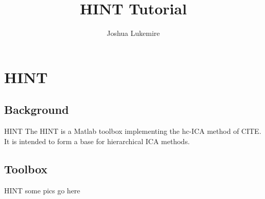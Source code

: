 \documentclass[11pt]{beamer}
\author{Joshua Lukemire}
\title{HINT Tutorial}
\begin{document}
\begin{frame}
\titlepage
\end{frame}

\begin{frame}
\tableofcontents
\end{frame}

\section{HINT}
\subsection{Background}

\begin{frame}{HINT}
The HINT is a Matlab toolbox implementing the hc-ICA method of CITE. It is intended to form a base for hierarchical ICA methods.
\end{frame}

\subsection{Toolbox}

\begin{frame}{HINT}
some pics go here
\end{frame}
\end{document}
